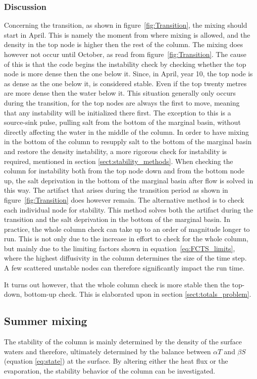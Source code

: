 \documentclass[twocolumn]{article}
\begin{document}
\subsubsection{Discussion}
Concerning the transition, as shown in figure~\ref{fig:Transition}, the mixing should start in April. This is namely the moment from where mixing is allowed, and the density in the top node is higher then the rest of the column. The mixing does however not occur until October, as read from figure~\ref{fig:Transition}. The cause of this is that the code begins the instability check by checking whether the top node is more dense then the one below it. Since, in April, year 10, the top node is as dense as the one below it, is considered stable. Even if the top twenty metres are more dense then the water below it. This situation generally only occurs during the transition, for the top nodes are always the first to move, meaning that any instability will be initialized there first. The exception to this is a source-sink pulse, pulling salt from the bottom of the marginal basin, without directly affecting the water in the middle of the column. In order to have mixing in the bottom of the column to resupply salt to the bottom of the marginal basin and restore the density instability, a more rigorous check for instability is required, mentioned in section \ref{sect:stability_methods}. When checking the column for instability both from the top node down and from the bottom node up, the salt deprivation in the bottom of the marginal basin after flow is solved in this way. The artifact that arises during the transition period as shown in figure~\ref{fig:Transition} does however remain.
The alternative method is to check each individual node for stability. This method solves both the artifact during the transition and the salt deprivation in the bottom of the marginal basin. In practice, the whole column check can take up to an order of magnitude longer to run. This is not only due to the increase in effort to check for the whole column, but mainly due to the limiting factors shown in equation~\ref{eq:FCTS_limits}, where the highest diffusivity in the column determines the size of the time step. A few scattered unstable nodes can therefore significantly impact the run time. 

It turns out however, that the whole column check is more stable then the top-down, bottom-up check. This is elaborated upon in section \ref{sect:totals_problem}.

\subsection{Summer mixing}
The stability of the column is mainly determined by the density of the surface waters and therefore, ultimately determined by the balance between $\alpha T$ and $\beta S$ (equation \ref{eq:state}) at the surface. By altering either the heat flux or the evaporation, the stability behavior of the column can be investigated.
\end{document}
